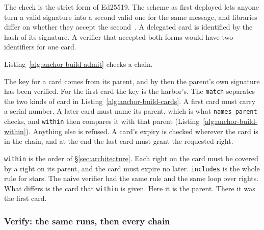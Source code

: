 The check is the strict form of Ed25519. The scheme as first deployed lets
anyone turn a valid signature into a second valid one for the same message,
and libraries differ on whether they accept the
second~. A delegated card is identified by the
hash of its signature. A verifier that accepted both forms would have two
identifiers for one card.

Listing~\ref{alg:anchor-build-admit} checks a chain.


The key for a card comes from its parent, and by then the parent's own
signature has been verified. For the first card the key is the harbor's. The
\texttt{match} separates the two kinds of card in
Listing~\ref{alg:anchor-build-cards}. A first card must carry a serial
number. A later card must name its parent, which is what
\texttt{names\_parent} checks, and \texttt{within} then compares it with
that parent (Listing~\ref{alg:anchor-build-within}). Anything else is
refused. A card's expiry is checked wherever the card is in the chain, and
at the end the last card must grant the requested right.


\texttt{within} is the order of \S\ref{sec:architecture}. Each right on the
card must be covered by a right on its parent, and the card must expire no
later. \texttt{includes} is the whole rule for stars. The naive verifier had
the same rule and the same loop over rights. What differs is the card that
\texttt{within} is given. Here it is the parent. There it was the first
card.

\pagebreak[0]

\subsubsection{Verify: the same runs, then every chain}

